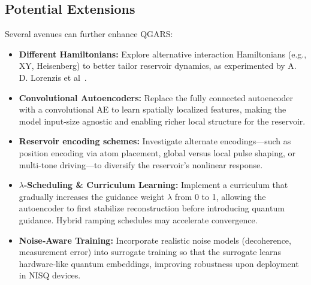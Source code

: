 \documentclass[conference]{IEEEtran}
\begin{document}
\subsection{Potential Extensions}
Several avenues can further enhance QGARS:
\begin{itemize}
    \item \textbf{Different Hamiltonians:}
    Explore alternative interaction Hamiltonians (e.g., XY, Heisenberg) to better tailor reservoir dynamics, as experimented by A. D. Lorenzis et al~\cite{lorenzisHarnessingQuantumExtreme2025}.

    \item \textbf{Convolutional Autoencoders:}
    Replace the fully connected autoencoder with a convolutional AE to learn spatially localized features, making the model input‐size agnostic and enabling richer local structure for the reservoir.
    
    \item \textbf{Reservoir encoding schemes:}
    Investigate alternate encodings—such as position encoding via atom placement, global versus local pulse shaping, or multi‐tone driving—to diversify the reservoir’s nonlinear response.
    
    \item \textbf{\(\lambda\)-Scheduling \& Curriculum Learning:}  
    Implement a curriculum that gradually increases the guidance weight \(\lambda\) from 0 to 1, allowing the autoencoder to first stabilize reconstruction before introducing quantum guidance. Hybrid ramping schedules may accelerate convergence.
    
    \item \textbf{Noise‐Aware Training:}  
    Incorporate realistic noise models (decoherence, measurement error) into surrogate training so that the surrogate learns hardware‐like quantum embeddings, improving robustness upon deployment in NISQ devices.

\end{itemize}
\end{document}
